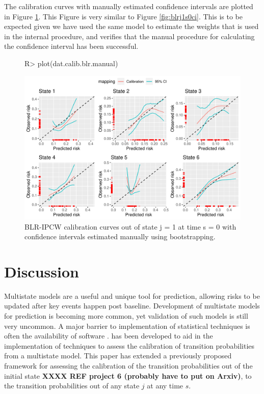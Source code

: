 \documentclass[nojss]{jss}
\begin{document}
The calibration curves with manually estimated confidence intervals are plotted in Figure \ref{fig:blrj1s0cimanual}. This Figure is very similar to Figure \ref{fig:blrj1s0ci}. This is to be expected given we have used the same model to estimate the weights that is used in the internal procedure, and verifies that the manual procedure for calculating the confidence interval has been successful.

\begin{figure}
\centering
\begin{Schunk}
\begin{Sinput}
R> plot(dat.calib.blr.manual)
\end{Sinput}
\end{Schunk}
\includegraphics{overview-023}
\caption{\label{fig:blrj1s0cimanual} BLR-IPCW calibration curves out of state j =  1 at time s = 0 with confidence intervals estimated manually using bootstrapping.}
\end{figure}


\section{Discussion} \label{sec:discussion}

Multistate models are a useful and unique tool for prediction, allowing risks to be updated after key events happen post baseline. Development of multistate models for prediction is becoming more common, yet validation of such models is still very uncommon. A major barrier to implementation of statistical techniques is often the availability of software \citep{Pullenayegum2016}.  has been developed to aid in the implementation of techniques to assess the calibration of transition probabilities from a multistate model. This paper has extended a previously proposed framework for assessing the calibration of the transition probabilities out of the initial state \textbf{XXXX REF project 6 (probably have to put on Arxiv)}, to the transition probabilities out of any state $j$ at any time $s$.
\end{document}
